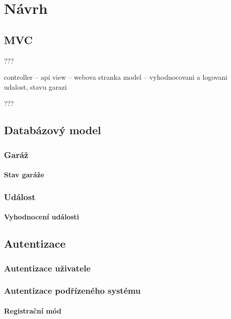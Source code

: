 \chapter{Návrh}
\label{sec:de}

\section{MVC}

???

controller -- api
view -- webova stranka
model -- vyhodnocovani a logovani udalost, stavu garazi

???

\section{Databázový model}

\subsection{Garáž}

\subsubsection{Stav garáže}

\subsection{Událost}

\subsubsection{Vyhodnocení události}

\section{Autentizace}

\subsection{Autentizace uživatele}

\subsection{Autentizace podřízeného systému}

\subsubsection{Registrační mód}

